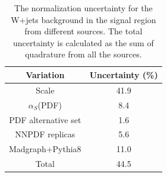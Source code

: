 \begin{table}[htbp!]
\begin{center}
\begin{tabular}{c|c}
Variation  &  Uncertainty (\%) \\
\hline
Scale                 &   41.9  \\
$\alpha_{S}$(PDF)     &   8.4   \\
PDF alternative set   &   1.6   \\
NNPDF replicas        &   5.6   \\
Madgraph+Pythia8      &   11.0   \\
\hline
Total                 &   44.5  \\
\end{tabular}
\end{center}
\caption[The normalization uncertainty for the W+Jets background in the SR
from different sources]{The normalization uncertainty for the W+jets background in the signal region
from different sources. The total uncertainty is calculated as the sum of quadrature from all
the sources.}
\label{tab:boosted_unc_wjets}
\end{table}
 
